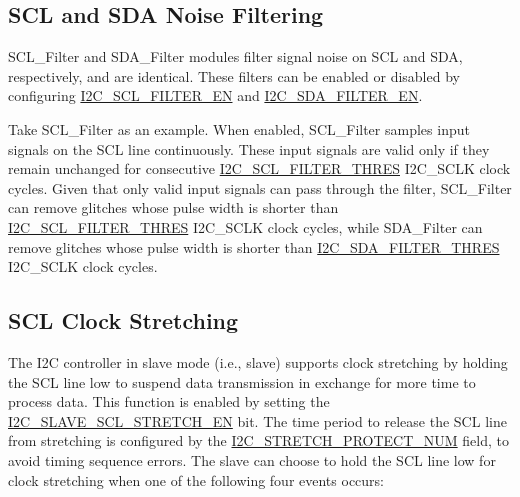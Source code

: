 \documentclass[main\_\_EN.tex]{subfiles}
\begin{document}
\subsection{SCL and SDA Noise Filtering}
SCL\_Filter and SDA\_Filter modules filter signal noise on SCL and SDA, respectively, and are identical. These filters can be enabled or disabled by configuring \hyperref[fielddesc:I2CSCLFILTEREN]{I2C\_SCL\_FILTER\_EN} and \hyperref[fielddesc:I2CSDAFILTEREN]{I2C\_SDA\_FILTER\_EN}.

Take SCL\_Filter as an example. When enabled, SCL\_Filter samples input signals on the SCL line continuously. These input signals are valid only if they remain unchanged for consecutive \hyperref[fielddesc:I2CSCLFILTERTHRES]{I2C\_SCL\_FILTER\_THRES} I2C\_SCLK clock cycles. Given that only valid input signals can pass through the filter, SCL\_Filter can remove glitches whose pulse width is shorter than \hyperref[fielddesc:I2CSCLFILTERTHRES]{I2C\_SCL\_FILTER\_THRES} I2C\_SCLK clock cycles, while SDA\_Filter can remove glitches whose pulse width is shorter than \hyperref[fielddesc:I2CSDAFILTERTHRES]{I2C\_SDA\_FILTER\_THRES} I2C\_SCLK clock cycles.


\subsection{SCL Clock Stretching}
The I2C controller in slave mode (i.e., slave) supports clock stretching by holding the SCL line low to suspend data transmission in exchange for more time to process data. This function is enabled by setting the \hyperref[fielddesc:I2CSLAVESCLSTRETCHEN]{I2C\_SLAVE\_SCL\_STRETCH\_EN} bit. The time period to release the SCL line from stretching is configured by the \hyperref[fielddesc:I2CSTRETCHPROTECTNUM]{I2C\_STRETCH\_PROTECT\_NUM} field, to avoid timing sequence errors.
The slave can choose to hold the SCL line low for clock stretching when one of the following four events occurs:
\end{document}
